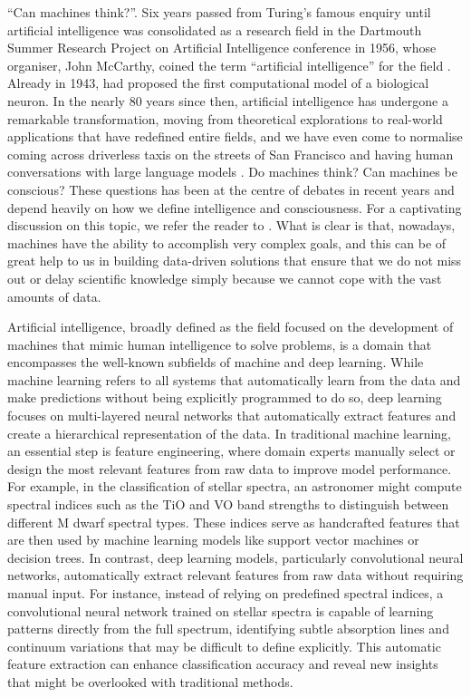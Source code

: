 ``Can machines think?''. Six years passed from Turing's famous enquiry \citep{turing} until artificial intelligence was consolidated as a research field in the Dartmouth Summer Research Project on Artificial Intelligence conference in 1956, whose organiser, John McCarthy, coined the term ``artificial intelligence'' for the field \citep{McCarthy2006}. Already in 1943, \citet{mcculloh1943} had proposed the first computational model of a biological neuron. In the nearly 80 years since then, artificial intelligence has undergone a remarkable transformation, moving from theoretical explorations to real-world applications that have redefined entire fields, and we have even come to normalise coming across driverless taxis \citep{auto_driving} on the streets of San Francisco and having human conversations with large language models \citep{bubeck2023,deepseek}. Do machines think? Can machines be conscious? These questions has been at the centre of debates in recent years and depend heavily on how we define intelligence and consciousness. For a captivating discussion on this topic, we refer the reader to \citet{qin2025}. What is clear is that, nowadays, machines have the ability to accomplish very complex goals, and this can be of great help to us in building data-driven solutions that ensure that we do not miss out or delay scientific knowledge simply because we cannot cope with the vast amounts of data.

Artificial intelligence, broadly defined as the field focused on the development of machines that mimic human intelligence to solve problems, is a domain that encompasses the well-known subfields of machine and deep learning. While machine learning refers to all systems that automatically learn from the data and make predictions without being explicitly programmed to do so, deep learning focuses on multi-layered neural networks that automatically extract features and create a hierarchical representation of the data. In traditional machine learning, an essential step is feature engineering, where domain experts manually select or design the most relevant features from raw data to improve model performance. For example, in the classification of stellar spectra, an astronomer might compute spectral indices such as the TiO and VO band strengths to distinguish between different M dwarf spectral types. These indices serve as handcrafted features that are then used by machine learning models like support vector machines or decision trees. In contrast, deep learning models, particularly convolutional neural networks, automatically extract relevant features from raw data without requiring manual input. For instance, instead of relying on predefined spectral indices, a convolutional neural network trained on stellar spectra is capable of learning patterns directly from the full spectrum, identifying subtle absorption lines and continuum variations that may be difficult to define explicitly. This automatic feature extraction can enhance classification accuracy and reveal new insights that might be overlooked with traditional methods.

